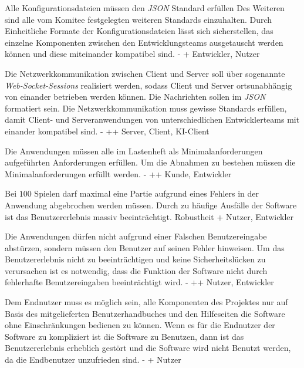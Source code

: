         {Alle Konfigurationsdateien müssen den \textit{JSON} Standard erfüllen Des Weiteren sind alle vom Komitee festgelegten weiteren Standards einzuhalten.}
        {Durch Einheitliche Formate der Konfigurationsdateien lässt sich sicherstellen, das einzelne Komponenten zwischen den Entwicklungsteams ausgetauscht werden können und diese miteinander kompatibel sind. }
        {-}
        {+}
        {Entwickler, Nutzer}

        {Die Netzwerkkommunikation zwischen Client und Server soll über sogenannte \textit{Web-Socket-Sessions} realisiert werden, sodass Client und Server ortsunabhängig von einander betrieben werden können. Die Nachrichten sollen im \textit{JSON} formatiert sein.}
        {Die Netzwerkkommunikation muss gewisse Standards erfüllen, damit Client- und Serveranwendungen von unterschiedlichen Entwicklerteams mit einander kompatibel sind.}
        {-}
        {++}
        {Server, Client, KI-Client}

        {Die Anwendungen müssen alle im Lastenheft als Minimalanforderungen aufgeführten Anforderungen erfüllen.}
        {Um die Abnahmen zu bestehen müssen die Minimalanforderungen erfüllt werden.}
        {-}
        {++}
        {Kunde, Entwickler}

        {Bei $100$ Spielen darf maximal eine Partie aufgrund eines Fehlers in der Anwendung abgebrochen werden müssen.}
        {Durch zu häufige Ausfälle der Software ist das Benutzererlebnis massiv beeinträchtigt.}
        {Robustheit}
        {+}
        {Nutzer, Entwickler}

        {Die Anwendungen dürfen nicht aufgrund einer Falschen Benutzereingabe abstürzen, sondern müssen den Benutzer auf seinen Fehler hinweisen.}
        {Um das Benutzererlebnis nicht zu beeinträchtigen und keine Sicherheitslücken zu verursachen ist es notwendig, dass die Funktion der Software nicht durch fehlerhafte Benutzereingaben beeinträchtigt wird.}
        {-}
        {++}
        {Nutzer, Entwickler}

        {Dem Endnutzer muss es möglich sein, alle Komponenten des Projektes nur auf Basis des mitgelieferten Benutzerhandbuches und den Hilfeseiten die Software ohne Einschränkungen bedienen zu können.}
        {Wenn es für die Endnutzer der Software zu kompliziert ist die Software zu Benutzen, dann ist das Benutzererlebnis erheblich gestört und die Software wird nicht Benutzt werden, da die Endbenutzer unzufrieden sind.}
        {-}
        {+}
        {Nutzer}
        
